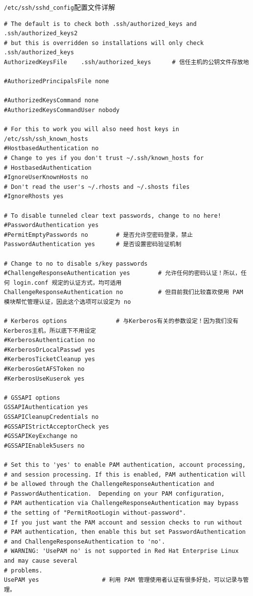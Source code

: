 \begin{ascboxB}{\texttt{/etc/ssh/sshd_config}配置文件详解}
\begin{verbatim}
# The default is to check both .ssh/authorized_keys and .ssh/authorized_keys2
# but this is overridden so installations will only check .ssh/authorized_keys
AuthorizedKeysFile    .ssh/authorized_keys      # 信任主机的公钥文件存放地

#AuthorizedPrincipalsFile none

#AuthorizedKeysCommand none
#AuthorizedKeysCommandUser nobody

# For this to work you will also need host keys in /etc/ssh/ssh_known_hosts
#HostbasedAuthentication no
# Change to yes if you don't trust ~/.ssh/known_hosts for
# HostbasedAuthentication
#IgnoreUserKnownHosts no
# Don't read the user's ~/.rhosts and ~/.shosts files
#IgnoreRhosts yes

# To disable tunneled clear text passwords, change to no here!
#PasswordAuthentication yes     
#PermitEmptyPasswords no        # 是否允许空密码登录，禁止
PasswordAuthentication yes      # 是否设置密码验证机制

# Change to no to disable s/key passwords
#ChallengeResponseAuthentication yes        # 允许任何的密码认证！所以，任何 login.conf 规定的认证方式，均可适用
ChallengeResponseAuthentication no          # 但目前我们比较喜欢使用 PAM 模块帮忙管理认证，因此这个选项可以设定为 no

# Kerberos options              # 与Kerberos有关的参数设定！因为我们没有Kerberos主机，所以底下不用设定
#KerberosAuthentication no
#KerberosOrLocalPasswd yes
#KerberosTicketCleanup yes
#KerberosGetAFSToken no
#KerberosUseKuserok yes

# GSSAPI options
GSSAPIAuthentication yes
GSSAPICleanupCredentials no
#GSSAPIStrictAcceptorCheck yes
#GSSAPIKeyExchange no
#GSSAPIEnablek5users no

# Set this to 'yes' to enable PAM authentication, account processing,
# and session processing. If this is enabled, PAM authentication will
# be allowed through the ChallengeResponseAuthentication and
# PasswordAuthentication.  Depending on your PAM configuration,
# PAM authentication via ChallengeResponseAuthentication may bypass
# the setting of "PermitRootLogin without-password".
# If you just want the PAM account and session checks to run without
# PAM authentication, then enable this but set PasswordAuthentication
# and ChallengeResponseAuthentication to 'no'.
# WARNING: 'UsePAM no' is not supported in Red Hat Enterprise Linux and may cause several
# problems.
UsePAM yes                  # 利用 PAM 管理使用者认证有很多好处，可以记录与管理。


\end{verbatim}
\end{ascboxB}
